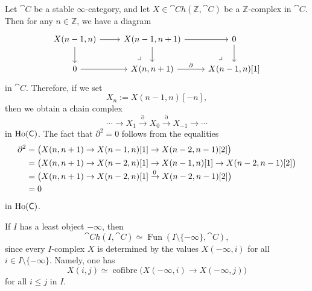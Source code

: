 \begin{example}
    Let $\cat{C}$ be a stable $\infty$-category,
    and let $X\in\cat{Ch}(\mathbb{Z},\cat{C})$ be a $\mathbb{Z}$-complex in $\cat{C}$.
    Then for any $n\in\mathbb{Z}$, we have a diagram
    \[\begin{tikzcd}
        X(n-1,n)\ar[r]\ar[d]\ar[dr,phantom,end anchor=north,pos=.75,"\lrcorner"] &
        X(n-1,n+1)\ar[r]\ar[d]\ar[dr,phantom,end anchor=north,pos=.75,"\lrcorner"] & 0\ar[d] \\
        0\ar[r] & X(n,n+1)\ar[r,"\partial"] & X(n-1,n)[1]
    \end{tikzcd}\]
    in $\cat{C}$. Therefore, if we set 
    \[X_n:=X(n-1,n)[-n],\]
    then we obtain a chain complex 
    \[ \cdots\to X_1\xrightarrow{\partial}X_0\xrightarrow{\partial}X_{-1}\to\cdots \]
    in $\operatorname{Ho}(\textup{\textsf{C}})$. The fact that $\partial^2=0$ follows from the equalities
    \[\begin{aligned}
        \partial^2
        &=\bigl(X(n,n+1)\to X(n-1,n)[1]\to X(n-2,n-1)[2]\bigr)\\
        &=\bigl(X(n,n+1)\to X(n-2,n)[1]\to X(n-1,n)[1]\to X(n-2,n-1)[2]\bigr)\\
        &=\bigl(X(n,n+1)\to X(n-2,n)[1]\smash{{}\xrightarrow0{}}X(n-2,n-1)[2]\bigr)\\
        &=0
    \end{aligned}\]
    in $\operatorname{Ho}(\textup{\textsf{C}})$. \varqed
\end{example}

\begin{remark}
    If $I$ has a least object $-\infty$, then
    \[ \cat{Ch}(I,\cat{C})\simeq\operatorname{Fun}(I\setminus\{-\infty\},\cat{C}), \]
    since every $I$-complex $X$ is determined by the values $X(-\infty,i)$
    for all $i\in I\setminus\{-\infty\}$. Namely, one has 
    \[ X(i,j)\simeq\operatorname{cofibre}\bigl(X(-\infty,i)\to X(-\infty,j)\bigr) \]
    for all $i\leq j$ in $I$. \varqed
\end{remark}

